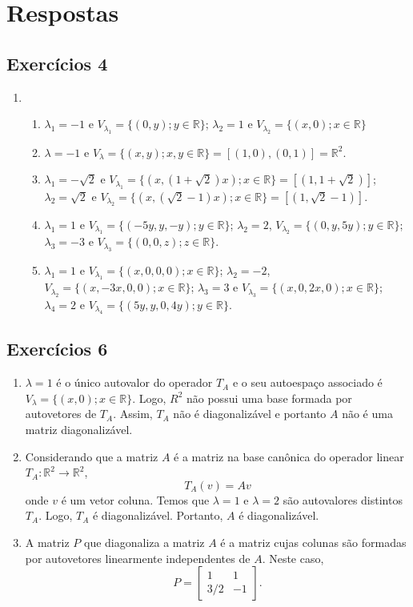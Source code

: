 \section{Respostas}
\subsection{ \textbf{Exercícios 4 }}
\begin{enumerate}
\item
\begin{enumerate}[label=(\alph*)]
\item $\lambda_1=-1$ e $V_{\lambda_1}=\{(0,y);  y \in \mathbb{R} \}$;  $\lambda_2=1$ e $V_{\lambda_2}=\{(x,0);  x \in \mathbb{R} \}$
\item $\lambda=-1$ e $V_{\lambda}=\{(x,y);  x, y \in \mathbb{R} \}= [ (1,0), (0,1)]=\mathbb{R}^2$.
\item $\lambda_1=-\sqrt{2}$ e $V_{\lambda_1}=\{(x,(1+\sqrt{2})x);  x\in \mathbb{R} \}=[(1, 1+\sqrt{2})]$;  $\lambda_2=\sqrt{2}$ e $V_{\lambda_2}=\{(x,(\sqrt{2}-1)x);  x \in \mathbb{R} \}=[(1, \sqrt{2}-1)]$.

\item $\lambda_1=1$ e $V_{\lambda_1}=\{(-5y,y,-y);  y \in \mathbb{R} \}$;  $\lambda_2=2$,  $V_{\lambda_2}=\{(0,y,5y);  y \in \mathbb{R} \}$;  $\lambda_3=-3$ e $V_{\lambda_3}=\{(0,0,z);  z \in \mathbb{R} \}$.

\item $\lambda_1=1$ e $V_{\lambda_1}=\{(x,0,0,0);  x \in \mathbb{R} \}$;  $\lambda_2=-2$,  $V_{\lambda_2}=\{(x,-3x,0,0);  x \in \mathbb{R} \}$;  $\lambda_3=3$ e $V_{\lambda_3}=\{(x,0,2x,0);  x \in \mathbb{R} \}$; $\lambda_4=2$ e $V_{\lambda_4}=\{(5y,y,0,4y);  y \in \mathbb{R} \}$.
\end{enumerate}
\end{enumerate}


\subsection{ \textbf{Exercícios 6 }}
\begin{enumerate}
\item  $\lambda =1$ é o único autovalor do operador $T_A$ e o seu  autoespaço associado é $V_{\lambda}=\{(x,0);  x \in \mathbb{R} \}$. Logo, $R^2$ não possui uma base formada por autovetores de $T_A$. Assim, $T_A$ não é diagonalizável e portanto $A$ não é uma matriz diagonalizável.

\item  Considerando que a matriz $A$ é a matriz na base canônica do operador linear $T_A:\mathbb{R}^2 \rightarrow \mathbb{R}^2$, $$ T_A(v)=Av$$ onde $v$ é um vetor coluna. Temos que $\lambda=1 $ e $\lambda=2$ são autovalores distintos  $T_A$. Logo, $T_A$ é diagonalizável. Portanto, $A$ é diagonalizável.
\item A matriz $P$ que diagonaliza a matriz $A$ é a matriz cujas colunas são formadas por autovetores linearmente independentes de $A$.  Neste caso, $$P= \begin{bmatrix}
1 & 1\\
 3/2& -1\end{bmatrix}.$$

\end{enumerate}
